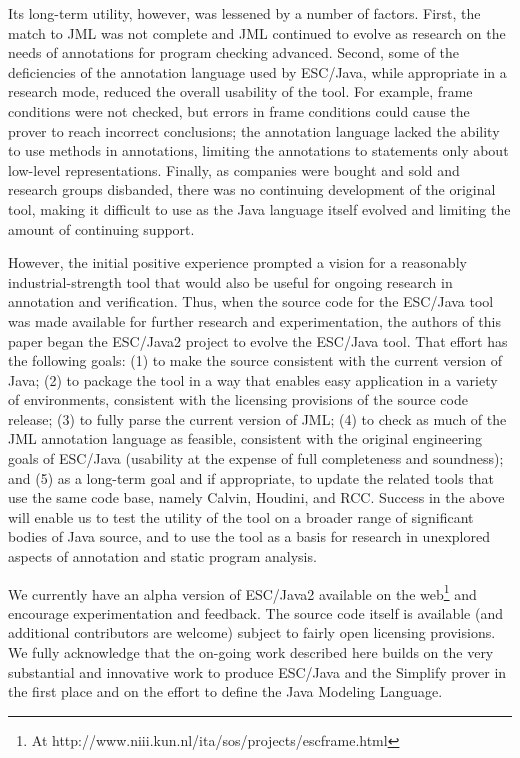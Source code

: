 \documentclass{acm_proc_article-sp}
\begin{document}
Its long-term utility, however, was lessened by a number of factors.
First, the match to JML was not complete and JML continued to evolve
as research on the needs of annotations for program checking advanced.
Second, some of the deficiencies of the annotation language used by
ESC/Java, while appropriate in a research mode, reduced the overall
usability of the tool.  For example, frame conditions were not
checked, but errors in frame conditions could cause the prover to
reach incorrect conclusions; the annotation language lacked the
ability to use methods in annotations, limiting the annotations to
statements only about low-level representations.  Finally, as
companies were bought and sold and research groups disbanded, there
was no continuing development of the original tool, making it
difficult to use as the Java language itself evolved and limiting the
amount of continuing support.

However, the initial positive experience prompted a vision for a
reasonably industrial-strength tool that would also be useful for
ongoing research in annotation and verification.  Thus, when the
source code for the ESC/Java tool was made available for further
research and experimentation, the authors of this paper began the
ESC/Java2 project to evolve the ESC/Java tool.  That effort has the
following goals:
(1) to make the source consistent with the current version of Java;
(2) to package the tool in a way that enables easy application in a
  variety of environments, consistent with the licensing provisions of
  the source code release;
(3) to fully parse the current version of JML;
(4) to check as much of the JML annotation language as feasible,
  consistent with the original engineering goals of ESC/Java
  (usability at the expense of full completeness and soundness);
and (5) as a long-term goal and if appropriate, to update the related
  tools that use the same code base, namely Calvin, Houdini, and RCC.
Success in the above will enable us to
 test the utility of the tool on a broader range of significant
  bodies of Java source, and
to use the tool as a basis for research in unexplored aspects of
  annotation and static program analysis.

We currently have an alpha version of ESC/Java2 available on the
web\footnote{At 
{http://www.niii.kun.nl/ita/sos/projects/escframe.html}}
and encourage experimentation and feedback.  The source code itself is
available (and additional contributors are welcome) subject to fairly
open licensing provisions.  We fully acknowledge that the on-going
work described here builds on the very substantial and innovative work
to produce ESC/Java and the Simplify prover in the first place and on
the effort to define the Java Modeling Language.
\end{document}
